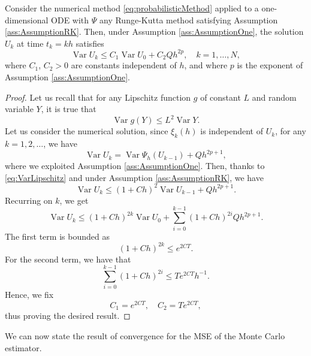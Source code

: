 \documentclass{siamart1116}
\numberwithin{theorem}{section}
\newcommand{\Var}{\operatorname{Var}}
\newcommand{\sksum}{\textstyle\sum}
\begin{document}
\begin{lemma}\label{lem:VarianceSolution} Consider the numerical method \eqref{eq:probabilisticMethod} applied to a one-dimensional ODE with $\Psi$ any Runge-Kutta method satisfying Assumption \ref{ass:AssumptionRK}. Then, under Assumption \ref{ass:AssumptionOne}, the solution $U_k$ at time $t_k = kh$ satisfies
	\begin{equation}\label{eq:BoundVariance}
			\Var U_k \leq C_1 \Var U_0 + C_2 Q h^{2p}, \quad k = 1, \ldots, N, 
	\end{equation}
	where $C_1$, $C_2 > 0$ are constants independent of $h$, and where $p$ is the exponent of Assumption \ref{ass:AssumptionOne}.
\end{lemma}
\begin{proof} Let us recall that for any Lipschitz function $g$ of constant $L$ and random variable $Y$, it is true that
	\begin{equation}\label{eq:VarLipschitz}
		\Var g(Y) \leq L^2 \Var Y.
	\end{equation}
	Let us consider the numerical solution, since $\xi_k(h)$ is independent of $U_k$, for any $k = 1, 2, \ldots$, we have
	\begin{equation}
		\Var U_k =  \Var\Psi_h(U_{k-1}) + Qh^{2p+1},
	\end{equation}
	where we exploited Assumption \ref{ass:AssumptionOne}. Then, thanks to \eqref{eq:VarLipschitz} and under Assumption \ref{ass:AssumptionRK}, we have
	\begin{equation}
		\Var U_k \leq (1 + Ch)^2 \Var U_{k-1} + Qh^{2p+1}.
	\end{equation}
	Recurring on $k$, we get
	\begin{equation}
		\Var U_k \leq (1 + Ch)^{2k} \Var U_0 + \sksum_{i=0}^{k-1} (1 + Ch)^{2i} Qh^{2p + 1}.
	\end{equation}
	The first term is bounded as
	\begin{equation}
		(1 + Ch)^{2k} \leq e^{2CT}.
	\end{equation}
	For the second term, we have that 
	\begin{equation}
		\sksum_{i=0}^{k-1} (1 + Ch)^{2i} \leq T e^{2CT}h^{-1}.
	\end{equation}
	Hence, we fix
	\begin{equation}
		C_1 = e^{2CT}, \quad C_2 =  T e^{2CT},
	\end{equation}
	thus proving the desired result.
\end{proof}

We can now state the result of convergence for the MSE of the Monte Carlo estimator.
\end{document}
